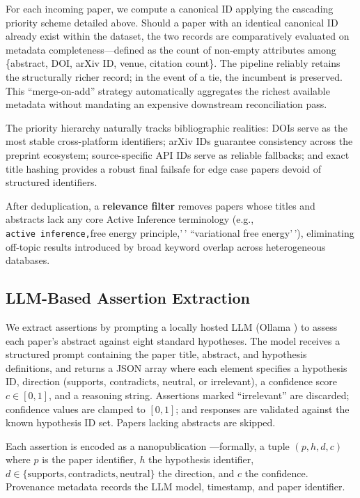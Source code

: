 \documentclass[
]{article}
\begin{document}
For each incoming paper, we compute a canonical ID applying the
cascading priority scheme detailed above. Should a paper with an
identical canonical ID already exist within the dataset, the two records
are comparatively evaluated on metadata completeness---defined as the
count of non-empty attributes among \{abstract, DOI, arXiv ID, venue,
citation count\}. The pipeline reliably retains the structurally richer
record; in the event of a tie, the incumbent is preserved. This
``merge-on-add'' strategy automatically aggregates the richest available
metadata without mandating an expensive downstream reconciliation pass.

The priority hierarchy naturally tracks bibliographic realities: DOIs
serve as the most stable cross-platform identifiers; arXiv IDs guarantee
consistency across the preprint ecosystem; source-specific API IDs serve
as reliable fallbacks; and exact title hashing provides a robust final
failsafe for edge case papers devoid of structured identifiers.

After deduplication, a \textbf{relevance filter} removes papers whose
titles and abstracts lack any core Active Inference terminology (e.g.,
\texttt{active\ inference,\textquotesingle{}\textquotesingle{}}free
energy principle,'\,' ``variational free energy'\,'), eliminating
off-topic results introduced by broad keyword overlap across
heterogeneous databases.

\subsection{LLM-Based Assertion
Extraction}\label{llm-based-assertion-extraction-1}

We extract assertions by prompting a locally hosted LLM (Ollama
\citep{ollama2024}) to assess each paper's abstract against eight
standard hypotheses. The model receives a structured prompt containing
the paper title, abstract, and hypothesis definitions, and returns a
JSON array where each element specifies a hypothesis ID, direction
(supports, contradicts, neutral, or irrelevant), a confidence score
\(c \in [0, 1]\), and a reasoning string. Assertions marked
``irrelevant'' are discarded; confidence values are clamped to
\([0, 1]\); and responses are validated against the known hypothesis ID
set. Papers lacking abstracts are skipped.

Each assertion is encoded as a nanopublication
\citep{groth2010anatomy, kuhn2016decentralized}---formally, a tuple
\((p, h, d, c)\) where \(p\) is the paper identifier, \(h\) the
hypothesis identifier,
\(d \in \{\text{supports}, \text{contradicts}, \text{neutral}\}\) the
direction, and \(c\) the confidence. Provenance metadata records the LLM
model, timestamp, and paper identifier.
\end{document}
